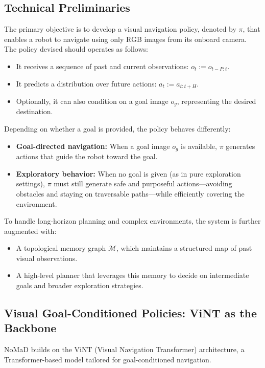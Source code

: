 \documentclass[12pt]{article}
\begin{document}
\begin{appendices}
\section{Technical Preliminaries}
\label{app:preliminaries}
The primary objective is to develop a visual navigation policy, denoted by $\pi$, that enables a robot to navigate using only RGB images from its onboard camera. \\
The policy devised should operates as follows:
\begin{itemize} 
    \item It receives a sequence of past and current observations: $o_t := o_{t-P : t}$. 
    \item It predicts a distribution over future actions: $a_t := a_{t : t+H}$. 
    \item Optionally, it can also condition on a goal image $o_g$, representing the desired destination. 
\end{itemize}
Depending on whether a goal is provided, the policy behaves differently: 
\begin{itemize} 
    \item \textbf{Goal-directed navigation:} When a goal image $o_g$ is available, $\pi$ generates actions that guide the robot toward the goal. 
    \item \textbf{Exploratory behavior:} When no goal is given (as in pure exploration settings), $\pi$ must still generate safe and purposeful actions—avoiding obstacles and staying on traversable paths—while efficiently covering the environment. 
\end{itemize}
To handle long-horizon planning and complex environments, the system is further augmented with: 
\begin{itemize} 
    \item A topological memory graph $\mathcal{M}$, which maintains a structured map of past visual observations. 
    \item A high-level planner that leverages this memory to decide on intermediate goals and broader exploration strategies. 
\end{itemize}
\subsection*{Visual Goal-Conditioned Policies: ViNT as the Backbone}
NoMaD builds on the ViNT (Visual Navigation Transformer) architecture, a Transformer-based model tailored for goal-conditioned navigation.\\

\end{appendices}
\end{document}
